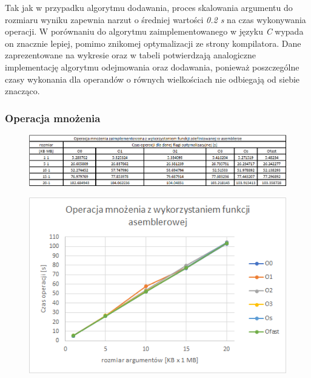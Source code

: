 \documentclass{article}
\begin{document}
\vspace{5mm}

Tak jak w przypadku algorytmu dodawania, proces skalowania argumentu do rozmiaru wyniku zapewnia narzut o średniej wartości \textit{0.2 s} na czas wykonywania operacji. W porównaniu do algorytmu zaimplementowanego w języku \textit{C} wypada on znacznie lepiej, pomimo znikomej optymalizacji ze strony kompilatora. Dane zaprezentowane na wykresie oraz w tabeli potwierdzają analogiczne implementację algorytmu odejmowania oraz dodawania, ponieważ poszczególne czasy wykonania dla operandów o równych wielkościach nie odbiegają od siebie znacząco.

\newpage{}

\subsubsection{Operacja mnożenia}

\begin{figure}[h!]

\includegraphics[scale=0.65]{charts/mul_asm.png}

\end{figure}

\begin{figure}[h!]
\centering
\includegraphics[scale=0.75]{charts/mul_asm_p.png}

\end{figure}
\end{document}
